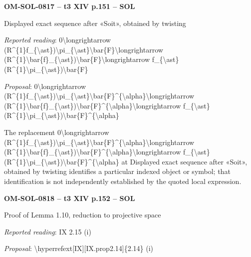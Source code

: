 \par\noindent\textbf{OM-SOL-0817 -- t3 XIV p.151 -- SOL}\par
Displayed exact sequence after «Soit», obtained by twisting\par
\emph{Reported reading}: 0\textbackslash{}longrightarrow (R\textasciicircum{}\{1\}f\_\{\textbackslash{}ast\})\textbackslash{}pi\_\{\textbackslash{}ast\}\textbackslash{}bar\{F\}\textbackslash{}longrightarrow (R\textasciicircum{}\{1\}\textbackslash{}bar\{f\}\_\{\textbackslash{}ast\})\textbackslash{}bar\{F\}\textbackslash{}longrightarrow f\_\{\textbackslash{}ast\}(R\textasciicircum{}\{1\}\textbackslash{}pi\_\{\textbackslash{}ast\})\textbackslash{}bar\{F\}\par
\emph{Proposal}: 0\textbackslash{}longrightarrow (R\textasciicircum{}\{1\}f\_\{\textbackslash{}ast\})\textbackslash{}pi\_\{\textbackslash{}ast\}\textbackslash{}bar\{F\}\textasciicircum{}\{\textbackslash{}alpha\}\textbackslash{}longrightarrow (R\textasciicircum{}\{1\}\textbackslash{}bar\{f\}\_\{\textbackslash{}ast\})\textbackslash{}bar\{F\}\textasciicircum{}\{\textbackslash{}alpha\}\textbackslash{}longrightarrow f\_\{\textbackslash{}ast\}(R\textasciicircum{}\{1\}\textbackslash{}pi\_\{\textbackslash{}ast\})\textbackslash{}bar\{F\}\textasciicircum{}\{\textbackslash{}alpha\}\par
The replacement 0\textbackslash{}longrightarrow (R\textasciicircum{}\{1\}f\_\{\textbackslash{}ast\})\textbackslash{}pi\_\{\textbackslash{}ast\}\textbackslash{}bar\{F\}\textasciicircum{}\{\textbackslash{}alpha\}\textbackslash{}longrightarrow (R\textasciicircum{}\{1\}\textbackslash{}bar\{f\}\_\{\textbackslash{}ast\})\textbackslash{}bar\{F\}\textasciicircum{}\{\textbackslash{}alpha\}\textbackslash{}longrightarrow f\_\{\textbackslash{}ast\}(R\textasciicircum{}\{1\}\textbackslash{}pi\_\{\textbackslash{}ast\})\textbackslash{}bar\{F\}\textasciicircum{}\{\textbackslash{}alpha\} at Displayed exact sequence after «Soit», obtained by twisting identifies a particular indexed object or symbol; that identification is not independently established by the quoted local expression.\par
\par\noindent\textbf{OM-SOL-0818 -- t3 XIV p.152 -- SOL}\par
Proof of Lemma 1.10, reduction to projective space\par
\emph{Reported reading}: IX 2.15 (i)\par
\emph{Proposal}: \textbackslash{}hyperrefext[IX][IX.prop2.14]\{2.14\} (i)\par
